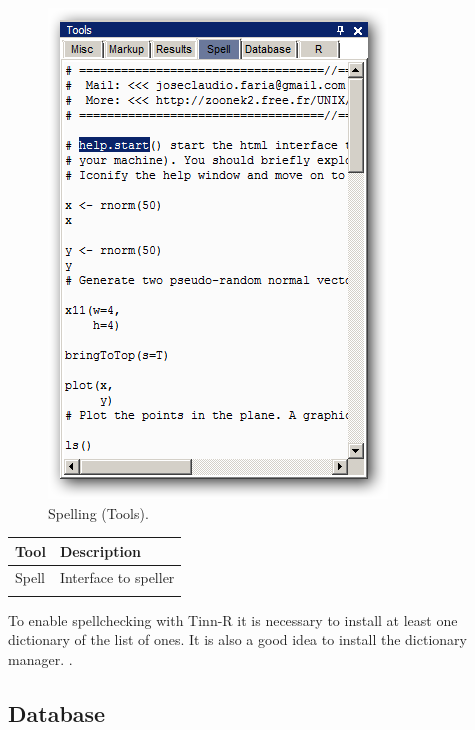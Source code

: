 \begin{figure}[h!]
  \includegraphics[scale=0.35]{./res/tools_spell.png}
  \caption{Spelling (Tools).}
  \label{fig:tools_spell}
\end{figure}

\begin{footnotesize}
  \begin{tabularx}{\textwidth}{>{\hsize=0.3\hsize}X>{\hsize=0.7\hsize}X}\\
    \hline
    \textbf{Tool} & \textbf{Description} \\
    \hline
    Spell & Interface to speller \\
    \hline
    \\
  \end{tabularx}
\end{footnotesize}

To enable spellchecking with Tinn-R it is necessary to install at
least one dictionary of the list of
 ones.
It is also a good idea to install the dictionary manager.
.


\hypertarget{working_tools_database}{}
\subsection{Database}

